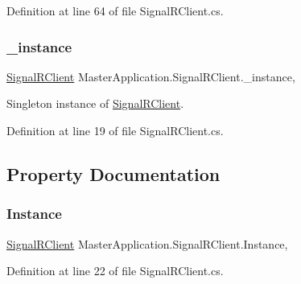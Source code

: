 Definition at line 64 of file Signal\+R\+Client.\+cs.

\mbox{\label{class_master_application_1_1_signal_r_client_a6ee898fc7dabd1c137b6eb1342df475f}} 
\subsubsection{\texorpdfstring{\+\_\+instance}{\_instance}}
{\footnotesize\ttfamily \mbox{\hyperlink{class_master_application_1_1_signal_r_client}{Signal\+R\+Client}} Master\+Application.\+Signal\+R\+Client.\+\_\+instance\hspace{0.3cm}{\ttfamily [static]}, {\ttfamily [private]}}



Singleton instance of \mbox{\hyperlink{class_master_application_1_1_signal_r_client}{Signal\+R\+Client}}. 



Definition at line 19 of file Signal\+R\+Client.\+cs.



\subsection{Property Documentation}
\mbox{\label{class_master_application_1_1_signal_r_client_a6fe29cdd3dbddd9a0fd08d0d697d6a13}} 
\subsubsection{\texorpdfstring{Instance}{Instance}}
{\footnotesize\ttfamily \mbox{\hyperlink{class_master_application_1_1_signal_r_client}{Signal\+R\+Client}} Master\+Application.\+Signal\+R\+Client.\+Instance\hspace{0.3cm}{\ttfamily [static]}, {\ttfamily [get]}}



Definition at line 22 of file Signal\+R\+Client.\+cs.



